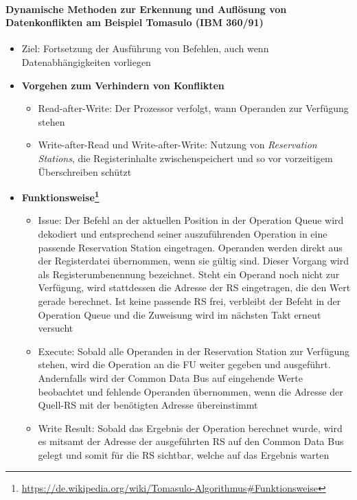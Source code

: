 \paragraph{Dynamische Methoden zur Erkennung und Auflösung von Datenkonflikten am Beispiel Tomasulo (IBM 360/91)}
\begin{itemize}
	\item Ziel: Fortsetzung der Ausführung von Befehlen, auch wenn Datenabhängigkeiten vorliegen
	\item \textbf{Vorgehen zum Verhindern von Konflikten}
	\begin{itemize}
		\item Read-after-Write: Der Prozessor verfolgt, wann Operanden zur Verfügung stehen
		\item Write-after-Read und Write-after-Write: Nutzung von \textit{Reservation Stations}, die Registerinhalte zwischenspeichert und so vor vorzeitigem Überschreiben schützt
	\end{itemize}
	\item \textbf{Funktionsweise\footnote{\url{https://de.wikipedia.org/wiki/Tomasulo-Algorithmus\#Funktionsweise}}}
	\begin{itemize}
		\item Issue: Der Befehl an der aktuellen Position in der Operation Queue wird dekodiert und entsprechend seiner auszuführenden Operation in eine passende Reservation Station eingetragen. Operanden werden direkt aus der Registerdatei übernommen, wenn sie gültig sind. Dieser Vorgang wird als Registerumbenennung bezeichnet. Steht ein Operand noch nicht zur Verfügung, wird stattdessen die Adresse der RS eingetragen, die den Wert gerade berechnet. Ist keine passende RS frei, verbleibt der Befeht in der Operation Queue und die Zuweisung wird im nächsten Takt erneut versucht
		\item Execute: Sobald alle Operanden in der Reservation Station zur Verfügung stehen, wird die Operation an die FU weiter gegeben und ausgeführt. Andernfalls wird der Common Data Bus auf eingehende Werte beobachtet und fehlende Operanden übernommen, wenn die Adresse der Quell-RS mit der benötigten Adresse übereinstimmt
		\item Write Result: Sobald das Ergebnis der Operation berechnet wurde, wird es mitsamt der Adresse der ausgeführten RS auf den Common Data Bus gelegt und somit für die RS sichtbar, welche auf das Ergebnis warten
	\end{itemize}
\end{itemize}

